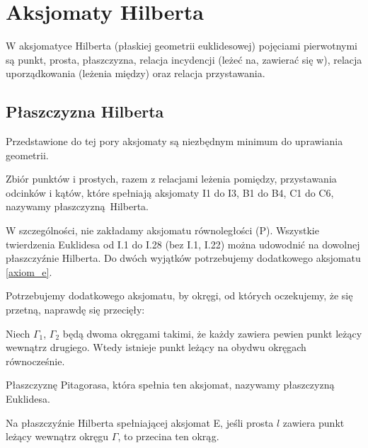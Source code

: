 %

\section{Aksjomaty Hilberta}
W aksjomatyce Hilberta (płaskiej geometrii euklidesowej) pojęciami pierwotnymi są punkt, prosta, płaszczyzna, relacja incydencji (leżeć na, zawierać się w), relacja uporządkowania (leżenia między) oraz relacja przystawania.






\subsection{Płaszczyzna Hilberta}

Przedstawione do tej pory aksjomaty są niezbędnym minimum do uprawiania geometrii.

\begin{definition}
    Zbiór punktów i prostych, razem z relacjami leżenia pomiędzy, przystawania odcinków i kątów, które spełniają aksjomaty I1 do I3, B1 do B4, C1 do C6, nazywamy płaszczyzną Hilberta.
\end{definition}

W szczególności, nie zakładamy aksjomatu równoległości (P).
Wszystkie twierdzenia Euklidesa od I.1 do I.28 (bez I.1, I.22) można udowodnić na dowolnej płaszczyźnie Hilberta.
Do dwóch wyjątków potrzebujemy dodatkowego aksjomatu \ref{axiom_e}.

Potrzebujemy dodatkowego aksjomatu, by okręgi, od których oczekujemy, że się przetną, naprawdę się przecięły:

\begin{axiom}
    \label{axiom_e}
    Niech $\Gamma_1$, $\Gamma_2$ będą dwoma okręgami takimi, że każdy zawiera pewien punkt leżący wewnątrz drugiego.
    Wtedy istnieje punkt leżący na obydwu okręgach równocześnie.
\end{axiom}

Płaszczyznę Pitagorasa, która spełnia ten aksjomat, nazywamy płaszczyzną Euklidesa.

\begin{proposition}
    Na płaszczyźnie Hilberta spełniającej aksjomat E, jeśli prosta $l$ zawiera punkt leżący wewnątrz okręgu $\Gamma$, to przecina ten okrąg.
\end{proposition}

